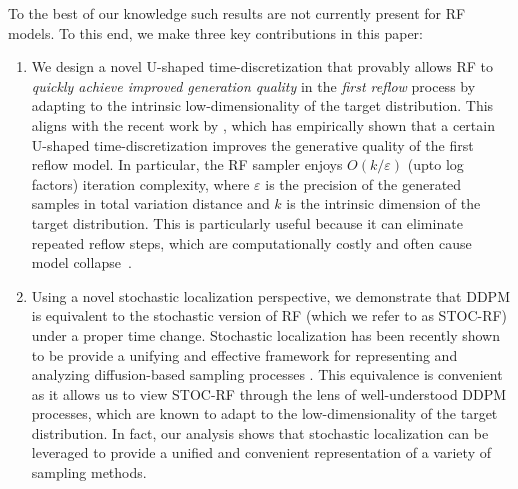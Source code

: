 \documentclass{article}
\theoremstyle{plain}
\theoremstyle{definition}
\theoremstyle{remark}
\begin{document}
To the best of our knowledge such results are not currently present for RF models.
To this end, we make three key contributions in this paper: 
\begin{enumerate}
    \item We design a novel U-shaped time-discretization that provably allows RF to \textit{quickly achieve improved generation quality} in the \textit{first reflow} process by adapting to the intrinsic low-dimensionality of the target distribution. 
    This aligns with the recent work
    by \citet{lee2024improvingtrainingrectifiedflows}, which has empirically shown that a certain
U-shaped time-discretization improves the generative quality of the first reflow model. 
    In particular, the RF sampler enjoys $O(k/\varepsilon)$ (upto log factors) iteration complexity, where $\varepsilon$ is the precision of the generated samples in total variation distance and $k$ is the intrinsic dimension of the target distribution. This is particularly useful because it can eliminate repeated reflow steps, which are computationally costly and often cause model collapse~\citep{model_collapse_zhu2024analyzing, reflow_bad_kim2025balanced}. 


 \item 
 Using a novel stochastic localization \cite{eldan2013thin,eldan2020taming} perspective, we demonstrate that DDPM is equivalent to the stochastic version of RF (which we refer to as STOC-RF) under a proper time change. Stochastic localization has been recently shown to be provide a unifying and effective framework for representing and analyzing diffusion-based sampling processes \citep{benton2023nearly, montanari2023sampling, el2022information}. 
 This equivalence is convenient as it allows us to view STOC-RF through the lens of well-understood DDPM processes, which are known to adapt to the low-dimensionality of the target distribution. In fact, our analysis shows that stochastic localization can be leveraged to provide a unified and convenient representation of a variety of sampling methods. %


\end{enumerate}
\end{document}
